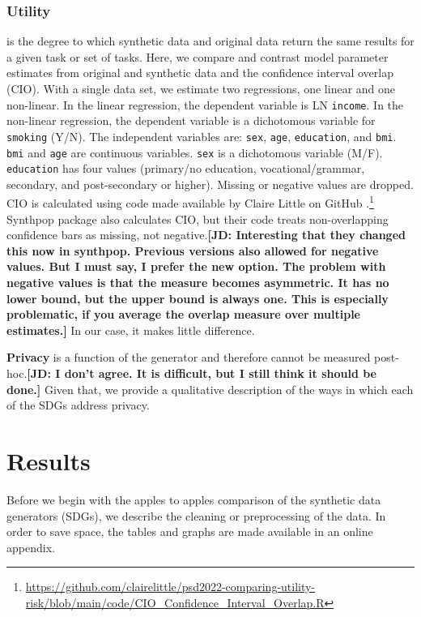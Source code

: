 \documentclass[runningheads]{llncs}
\newcommand{\jd}[1]{\scriptsize {\bf \color{red}[JD: #1]}\normalsize}
\begin{document}
\subsubsection{Utility} is the degree to which synthetic data and original data return the same results for a given task or set of tasks.  Here, we compare and contrast model parameter estimates from original and synthetic data and the confidence interval overlap (CIO).  With a single data set, we estimate two regressions, one linear and one non-linear.  In the linear regression, the dependent variable is LN \texttt{income}.  In the non-linear regression, the dependent variable is a dichotomous variable for \texttt{smoking} (Y/N).  The independent variables are: \texttt{sex}, \texttt{age}, \texttt{education}, and \texttt{bmi}.  \texttt{bmi} and \texttt{age} are continuous variables.  \texttt{sex} is a dichotomous variable (M/F).  \texttt{education} has four values (primary/no education, vocational/grammar, secondary, and post-secondary or higher).  Missing or negative values are dropped.  CIO is calculated using code made available by Claire Little on GitHub \cite{little2022comparing,karr2006framework}.\footnote{\url{https://github.com/clairelittle/psd2022-comparing-utility-risk/blob/main/code/CIO_Confidence_Interval_Overlap.R}}  Synthpop package also calculates CIO, but their code treats non-overlapping confidence bars as missing, not negative.\jd{Interesting that they changed this now in synthpop. Previous versions also allowed for negative values. But I must say, I prefer the new option. The problem with negative values is that the measure becomes asymmetric. It has no lower bound, but the upper bound is always one. This is especially problematic, if you average the overlap measure over multiple estimates.}  In our case, it makes little difference.

{\bf Privacy} is a function of the generator and therefore cannot be measured post-hoc.\jd{I don't agree. It is difficult, but I still think it should be done.}  Given that, we provide a qualitative description of the ways in which each of the SDGs address privacy.  

\section{Results}\label{sec:results}

Before we begin with the apples to apples comparison of the synthetic data generators (SDGs), we describe the cleaning or preprocessing of the data.  In order to save space, the tables and graphs are made available in an online appendix.  
\end{document}
